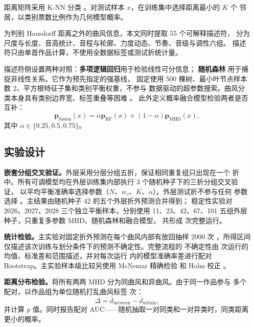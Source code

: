 \documentclass[UTF8,a4paper,12pt]{ctexart}
\begin{document}
距离矩阵采用 K-NN 分类 \cite{knn}。对测试样本 $x$，在训练集中选择距离最小的 $K$ 个
邻居，以类别票数比例作为几何模型概率。

为判别 Hausdorff 距离之外的曲风信息，本文同时提取 55 个可解释描述符，
分为尺度与长度、音高统计、音程与轮廓、力度动态、节奏、音级与调性六组。
描述符只由单首作品计算，不使用全数据标签或测试折统计量。

描述符侧设置两种对照：\textbf{多项逻辑回归}用于检验线性可分信息；
\textbf{随机森林} \cite{rf} 用于捕捉非线性关系。它作为预先指定的强基线，
固定使用 500 棵树、最小叶节点样本数 2、平方根特征子集和类别平衡权重，不参与
数据驱动的超参数搜索。曲风分类本身具有类别边界宽、标签重叠等困难
\cite{genre}。
此外定义概率融合模型检验两者是否互补：
\begin{equation}
  \bm{p}_{\mathrm{fusion}}(x)=\alpha\bm{p}_{\mathrm{RF}}(x)+(1-\alpha)\bm{p}_{\mathrm{MHD}}(x),
  \label{eq:fusion}
\end{equation}
其中 $\alpha\in\{0.25,0.5,0.75\}$。

\subsection{实验设计}

\textbf{嵌套分组交叉验证。}外层采用分层分组五折，保证相同重复组只出现在一个
折中。所有可调模型均在外层训练集内部执行 3 个随机种子下的三折分组交叉验证，
以平均平衡准确率选择参数（$N$、$w_v$、$K$、$\alpha$）。外层测试折不参与任何
参数选择 \cite{varma,cawley}。主结果由随机种子 42 的五个外层折外预测合并得到；
稳定性实验对 2026、2027、2028 三个独立平衡样本，分别使用
11、23、42、67、101 五组外层种子，只重复多参数 MHD、随机森林和融合模型，
共形成 \ValidationRunCount 次完整运行。

\textbf{统计检验。}主实验对固定折外预测在每个曲风内部有放回抽样 2000 次
\cite{efron}，所得区间仅描述该次训练与划分条件下的预测不确定性。完整流程的
不确定性由 \ValidationRunCount 次运行的均值、标准差和范围描述，并对每次运行
内的模型准确率差进行配对 Bootstrap。主实验样本级比较另使用 McNemar 精确检验
\cite{mcnemar} 和 Holm 校正 \cite{holm}。

\textbf{距离分布检验。}将所有两两 MHD 分为同曲风和异曲风。由于同一作品参与
多个配对，以作品组为单位随机打乱曲风标签 \PermutationCount 次：
\begin{equation}
  \Delta=\overline{d}_{\mathrm{between}}-\overline{d}_{\mathrm{within}},
\end{equation}
并计算 $p$ 值。同时报告配对 AUC——随机抽取一对同类和一对异类时，同类距离
更小的概率。
\end{document}
